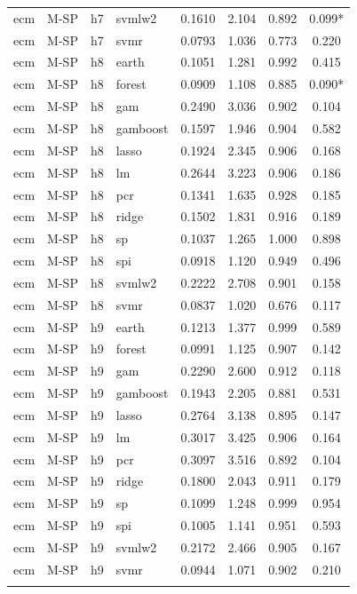 \begin{ThreePartTable}
\begin{longtable}[t]{llclcccc}
ecm & M-SP & h7 & svmlw2 & 0.1610 & 2.104 & 0.892 & 0.099*\\
ecm & M-SP & h7 & svmr & 0.0793 & 1.036 & 0.773 & 0.220\\
\addlinespace
ecm & M-SP & h8 & earth & 0.1051 & 1.281 & 0.992 & 0.415\\
ecm & M-SP & h8 & forest & 0.0909 & 1.108 & 0.885 & 0.090*\\
ecm & M-SP & h8 & gam & 0.2490 & 3.036 & 0.902 & 0.104\\
ecm & M-SP & h8 & gamboost & 0.1597 & 1.946 & 0.904 & 0.582\\
ecm & M-SP & h8 & lasso & 0.1924 & 2.345 & 0.906 & 0.168\\
ecm & M-SP & h8 & lm & 0.2644 & 3.223 & 0.906 & 0.186\\
ecm & M-SP & h8 & pcr & 0.1341 & 1.635 & 0.928 & 0.185\\
ecm & M-SP & h8 & ridge & 0.1502 & 1.831 & 0.916 & 0.189\\
ecm & M-SP & h8 & sp & 0.1037 & 1.265 & 1.000 & 0.898\\
ecm & M-SP & h8 & spi & 0.0918 & 1.120 & 0.949 & 0.496\\
ecm & M-SP & h8 & svmlw2 & 0.2222 & 2.708 & 0.901 & 0.158\\
ecm & M-SP & h8 & svmr & 0.0837 & 1.020 & 0.676 & 0.117\\
\addlinespace
ecm & M-SP & h9 & earth & 0.1213 & 1.377 & 0.999 & 0.589\\
ecm & M-SP & h9 & forest & 0.0991 & 1.125 & 0.907 & 0.142\\
ecm & M-SP & h9 & gam & 0.2290 & 2.600 & 0.912 & 0.118\\
ecm & M-SP & h9 & gamboost & 0.1943 & 2.205 & 0.881 & 0.531\\
ecm & M-SP & h9 & lasso & 0.2764 & 3.138 & 0.895 & 0.147\\
ecm & M-SP & h9 & lm & 0.3017 & 3.425 & 0.906 & 0.164\\
ecm & M-SP & h9 & pcr & 0.3097 & 3.516 & 0.892 & 0.104\\
ecm & M-SP & h9 & ridge & 0.1800 & 2.043 & 0.911 & 0.179\\
ecm & M-SP & h9 & sp & 0.1099 & 1.248 & 0.999 & 0.954\\
ecm & M-SP & h9 & spi & 0.1005 & 1.141 & 0.951 & 0.593\\
ecm & M-SP & h9 & svmlw2 & 0.2172 & 2.466 & 0.905 & 0.167\\
ecm & M-SP & h9 & svmr & 0.0944 & 1.071 & 0.902 & 0.210\\
\addlinespace

\end{longtable}
\end{ThreePartTable}
